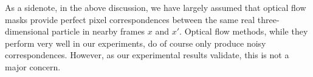 \documentclass{article}
\newcommand{\jd}[1]{\textcolor{orange}{[DJ: #1]}}
\begin{document}
As a sidenote, in the above discussion, we have largely assumed that optical flow masks provide perfect pixel correspondences between the same real three-dimensional particle in nearby frames $x$ and $x'$. Optical flow methods, while they perform very well in our experiments, do of course only produce noisy correspondences. However, as our experimental results validate, this is not a major concern.









\end{document}
